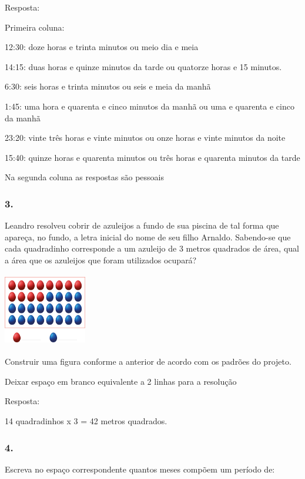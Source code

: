 Resposta:

Primeira coluna:

12:30: doze horas e trinta minutos ou meio dia e meia

14:15: duas horas e quinze minutos da tarde ou quatorze horas e 15
minutos.

6:30: seis horas e trinta minutos ou seis e meia da manhã

1:45: uma hora e quarenta e cinco minutos da manhã ou uma e quarenta e
cinco da manhã

23:20: vinte três horas e vinte minutos ou onze horas e vinte minutos da
noite

15:40: quinze horas e quarenta minutos ou três horas e quarenta minutos
da tarde

Na segunda coluna as respostas são pessoais

\subsubsection{3.}\label{section-54}

Leandro resolveu cobrir de azuleijos a fundo de sua piscina de tal forma
que apareça, no fundo, a letra inicial do nome de seu filho Arnaldo.
Sabendo-se que cada quadradinho corresponde a um azuleijo de 3 metros
quadrados de área, qual a área que os azuleijos que foram utilizados
ocupará?

\includegraphics[width=1.42949in,height=1.25160in]{media/image63.png}

Construir uma figura conforme a anterior de acordo com os padrões do
projeto.

Deixar espaço em branco equivalente a 2 linhas para a resolução

Resposta:

14 quadradinhos x 3 = 42 metros quadrados.

\subsubsection{4.}\label{section-55}

Escreva no espaço correspondente quantos meses compõem um período de:


